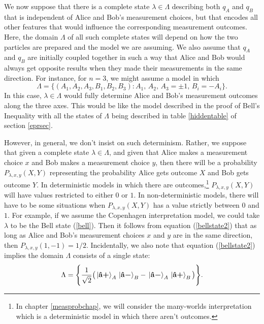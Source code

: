 We now suppose that there is a complete state $\lambda\in\Lambda$ %
%
describing both $q_A$ and $q_B$ that is independent of Alice and Bob's measurement choices, but that encodes all other features that would influence the corresponding measurement outcomes. Here, the domain $\Lambda$ of all such complete states will depend on how the two particles are prepared and the model we are assuming. We also assume that  $q_A$ and $q_B$ are initially coupled together in such a way that Alice and Bob would always get opposite results when they made their measurements in the same direction. For instance, for $n=3$, we might assume a model in which 
\begin{equation}\label{bellLambda}
\Lambda=\big\{(A_1, A_2, A_3 ,B_1, B_2, B_3):A_1,\, A_2,\, A_3=\pm1,\, B_i=-A_i\big\}.
\end{equation}
 In this case, $\lambda\in\Lambda$ would fully determine Alice and Bob's measurement outcomes along the three axes. This would be like the model described in the proof of Bell's Inequality with all the states of $\Lambda$ being described in table \ref{hiddentable} of section \ref{eprsec}. 
 
However, in general, we don't insist on such determinism. Rather, we suppose that given a complete state $\lambda\in\Lambda$, and given that Alice makes a measurement choice $x$ and Bob makes a measurement choice $y$, then there will be a probability $P_{\lambda,x,y}(X , Y)$ %
%
representing the probability Alice gets outcome $X$ and Bob gets outcome $Y$. In deterministic models in which there are outcomes,\footnote{In chapter \ref{measprobchap}, we will consider the many-worlds interpretation which is a deterministic model in which there aren't outcomes.} $P_{\lambda,x,y}(X , Y)$ will have values restricted to either $0$ or $1$. In non-deterministic models, there will have to be some situations when $P_{\lambda,x,y}(X, Y)$ has a value strictly between $0$ and $1$. For example, if we assume the Copenhagen interpretation model, we could take $\lambda$ to be the Bell state (\ref{bell}). Then it follows from equation (\ref{bellstate2}) that as long as Alice and Bob's measurement choices $x$ and $y$ are in the same direction, then $P_{\lambda,x,y}(1,-1)=1/2$. Incidentally, we also note that equation (\ref{bellstate2}) implies the domain $\Lambda$ consists of a single state:
\begin{equation}\label{quantumLambda}
\Lambda=\Bigg\{\frac{1}{\sqrt{2}}\big(\ket*{{\vb{\hat{{a}}}\bm{+}}}_A\ket*{{\vb{\hat{{a}}}\bm{-}}}_B-\ket*{{\vb{\hat{{a}}}\bm{-}}}_A\ket*{{\vb{\hat{{a}}}\bm{+}}}_B\big)\Bigg\}.
\end{equation}

